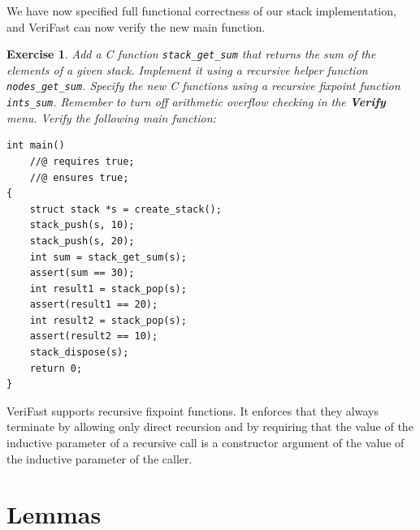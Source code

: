 \documentclass{article}
\newtheorem{exercise}{Exercise}
\begin{document}
We have now specified full functional correctness of our stack
implementation, and VeriFast can now verify the new main
function.

\begin{exercise}\label{exercise:sum_full}
Add a C function \lstinline!stack_get_sum! that returns the sum
of the elements of a given stack. Implement it using a
recursive helper function \lstinline!nodes_get_sum!. Specify
the new C functions using a recursive fixpoint function
\lstinline!ints_sum!. Remember to turn off arithmetic
overflow checking in the \textbf{Verify} menu. Verify the
following main function:
\end{exercise}
\begin{lstlisting}
int main()
    //@ requires true;
    //@ ensures true;
{
    struct stack *s = create_stack();
    stack_push(s, 10);
    stack_push(s, 20);
    int sum = stack_get_sum(s);
    assert(sum == 30);
    int result1 = stack_pop(s);
    assert(result1 == 20);
    int result2 = stack_pop(s);
    assert(result2 == 10);
    stack_dispose(s);
    return 0;
}
\end{lstlisting}

VeriFast supports recursive fixpoint functions. It enforces
that they always terminate by allowing only direct recursion
and by requiring that the value of the inductive parameter of a
recursive call is a constructor argument of the value of the
inductive parameter of the caller.

\section{Lemmas}
\end{document}
